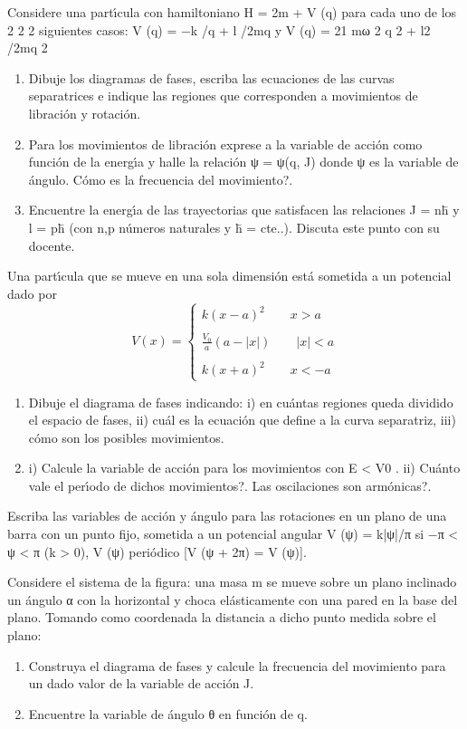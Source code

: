 \documentclass[10pt,oneside]{CBFT_book}
\begin{document}
\begin{ejercicios}
\label{ej11}
\item{ \bf }
Considere una partı́cula con hamiltoniano H = 2m + V (q) para cada uno de los 2 2 2 siguientes casos: V (q) = −k /q + l /2mq y V (q) = 21 mω 2 q 2 + l2 /2mq 2
\begin{enumerate}[label=(\alph*)]
\item Dibuje los diagramas de fases, escriba las ecuaciones de las curvas separatrices e
indique las regiones que corresponden a movimientos de libración y rotación.
\item Para los movimientos de libración exprese a la variable de acción como función
de la energı́a y halle la relación ψ = ψ(q, J) donde ψ es la variable de ángulo.
Cómo es la frecuencia del movimiento?.
\item Encuentre la energı́a de las trayectorias que satisfacen las relaciones J = nh̄ y
l = ph̄ (con n,p números naturales y h̄ = cte..). Discuta este punto con su
docente.
\end{enumerate}

\label{ej12}
\item{ \bf }
Una partı́cula que se mueve en una sola dimensión está sometida a un potencial dado por
\[
	V(x) = \begin{cases}
			k (x - a)^2 \qquad x > a \\
	        \\
	        \frac{V_0}{a} (a - |x|) \qquad |x| < a \\
	        \\
	        k (x + a)^2 \qquad x < -a
	        \end{cases}
\]
\begin{enumerate}[label=(\alph*)]
\item Dibuje el diagrama de fases indicando: i) en cuántas regiones queda dividido el
espacio de fases, ii) cuál es la ecuación que define a la curva separatriz, iii) cómo
son los posibles movimientos.
\item i) Calcule la variable de acción para los movimientos con E < V0 . ii) Cuánto
vale el perı́odo de dichos movimientos?. Las oscilaciones son armónicas?.
\end{enumerate}

\label{ej13}
\item{ \bf }
Escriba las variables de acción y ángulo para las rotaciones en un plano de una barra
con un punto fijo, sometida a un potencial angular V (ψ) = k|ψ|/π si −π < ψ < π
(k > 0), V (ψ) periódico [V (ψ + 2π) = V (ψ)].

\label{ej14}
\item{ \bf }
Considere el sistema de la figura: una masa m se mueve sobre un plano inclinado un
ángulo α con la horizontal y choca elásticamente con una pared en la base del plano.
Tomando como coordenada la distancia a dicho punto medida sobre el plano:
\begin{enumerate}[label=(\alph*)]
\item Construya el diagrama de fases y calcule la frecuencia del movimiento para un
dado valor de la variable de acción J.
\item Encuentre la variable de ángulo θ en función de q.
\end{enumerate}


\end{ejercicios}
\end{document}
